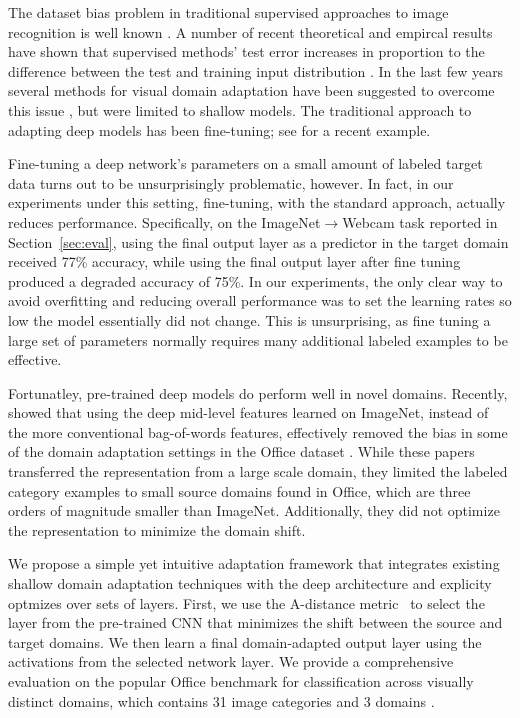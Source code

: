 The dataset bias problem in traditional supervised approaches to image
recognition is well known \cite{efros-cvpr11}.  A number of recent theoretical and empircal 
results have shown that supervised methods' test error increases in
proportion to the difference between the test and training input
distribution \cite{ben2007analysis, blitzer2007learning,saenko-eccv10,efros-cvpr11}.  In the last few
years several methods for visual domain adaptation have been suggested
to overcome this
issue \cite{daume,yang-icdm07,aytar-iccv11,saenko-eccv10,kulis-cvpr11,Khosla-eccv12,gopalan-iccv11,gong-cvpr12,hoffman-eccv12,hoffman-iclr13},
but were limited to shallow models. The traditional approach to
adapting deep models has been fine-tuning; see \cite{rcnn} for a
recent example.  

Fine-tuning a deep network's parameters on a small amount of labeled
target data turns out to be unsurprisingly problematic, however.  In
fact, in our experiments under this setting, fine-tuning, with the
standard approach, actually reduces performance.  Specifically, on the
ImageNet$\rightarrow$Webcam task reported in Section~\ref{sec:eval},
using the final output layer as a predictor in the target domain
received 77\% accuracy, while using the final output layer after fine
tuning produced a degraded accuracy of 75\%. In our experiments, the
only clear way to avoid overfitting and reducing overall performance
was to set the learning rates so low the model essentially did not
change. This is unsurprising, as fine tuning a large set of parameters
normally requires many additional labeled examples to be effective.


Fortunatley, pre-trained deep models do perform well in novel domains.
Recently, \cite{ICML-decaf,JudyICLRW} showed that using the deep
mid-level features learned on ImageNet, instead of the more
conventional bag-of-words features, effectively removed the bias in
some of the domain adaptation settings in the Office
dataset \cite{saenko-eccv10}.   While these papers transferred
the representation from a large scale domain, they limited the labeled
category examples to small source domains found in Office, which are
three orders of magnitude smaller than ImageNet. Additionally, they
did not optimize the representation to minimize the domain shift.

We propose a simple yet intuitive adaptation framework that integrates
existing shallow domain adaptation techniques with the deep
architecture and explicity optmizes over sets of layers.  First, we
use the A-distance metric~\cite{adist} to select the layer from the
pre-trained CNN that minimizes the shift between the source and target
domains.  We then learn a final domain-adapted output layer using the
activations from the selected network layer.  We provide a
comprehensive evaluation on the popular Office benchmark for
classification across visually distinct domains, which contains 31
image categories and 3 domains \cite{saenko-eccv10}.

